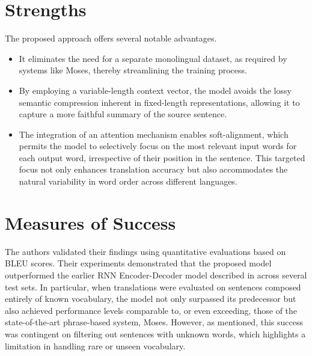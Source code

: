 \documentclass[10pt]{article}
\begin{document}
\section*{Strengths}
The proposed approach offers several notable advantages.
\begin{itemize}
    \item It eliminates the need for a separate monolingual dataset, as required by systems like Moses, thereby streamlining the training process.
    \item By employing a variable-length context vector, the model avoids the lossy semantic compression inherent in fixed-length representations, allowing it to capture a more faithful summary of the source sentence.
    \item The integration of an attention mechanism enables soft-alignment, which permits the model to selectively focus on the most relevant input words for each output word, irrespective of their position in the sentence. This targeted focus not only enhances translation accuracy but also accommodates the natural variability in word order across different languages.
\end{itemize}


\section*{Measures of Success}
The authors validated their findings using quantitative evaluations based on BLEU scores. Their experiments demonstrated that the proposed model outperformed the earlier RNN Encoder-Decoder model described in \cite{cho2014} across several test sets. In particular, when translations were evaluated on sentences composed entirely of known vocabulary, the model not only surpassed its predecessor but also achieved performance levels comparable to, or even exceeding, those of the state-of-the-art phrase-based system, Moses. However, as mentioned, this success was contingent on filtering out sentences with unknown words, which highlights a limitation in handling rare or unseen vocabulary.
\end{document}
